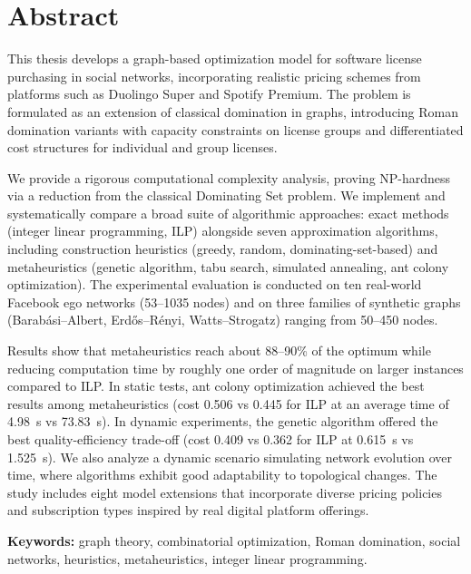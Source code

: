 \newpage
\section*{Abstract}

This thesis develops a graph-based optimization model for software license purchasing in social networks, incorporating realistic pricing schemes from platforms such as Duolingo Super and Spotify Premium. The problem is formulated as an extension of classical domination in graphs, introducing Roman domination variants with capacity constraints on license groups and differentiated cost structures for individual and group licenses.

We provide a rigorous computational complexity analysis, proving NP-hardness via a reduction from the classical Dominating Set problem. We implement and systematically compare a broad suite of algorithmic approaches: exact methods (integer linear programming, ILP) alongside seven approximation algorithms, including construction heuristics (greedy, random, dominating-set-based) and metaheuristics (genetic algorithm, tabu search, simulated annealing, ant colony optimization). The experimental evaluation is conducted on ten real-world Facebook ego networks (53--1035 nodes) and on three families of synthetic graphs (Barabási--Albert, Erdős--Rényi, Watts--Strogatz) ranging from 50--450 nodes.

Results show that metaheuristics reach about 88--90\% of the optimum while reducing computation time by roughly one order of magnitude on larger instances compared to ILP. In static tests, ant colony optimization achieved the best results among metaheuristics (cost 0.506 vs 0.445 for ILP at an average time of 4.98~s vs 73.83~s). In dynamic experiments, the genetic algorithm offered the best quality-efficiency trade-off (cost 0.409 vs 0.362 for ILP at 0.615~s vs 1.525~s). We also analyze a dynamic scenario simulating network evolution over time, where algorithms exhibit good adaptability to topological changes. The study includes eight model extensions that incorporate diverse pricing policies and subscription types inspired by real digital platform offerings.

\textbf{Keywords:} graph theory, combinatorial optimization, Roman domination, social networks, heuristics, metaheuristics, integer linear programming.
